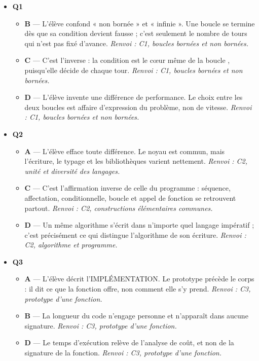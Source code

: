 \begin{itemize}
  \item \textbf{Q1}
  \begin{itemize}
    \item \textbf{B} — L'élève confond « non bornée » et « infinie ». Une boucle  se termine dès que sa condition devient fausse ; c'est seulement le nombre de tours qui n'est pas fixé d'avance. \emph{Renvoi : C1, boucles bornées et non bornées.}
    \item \textbf{C} — C'est l'inverse : la condition est le cœur même de la boucle , puisqu'elle décide de chaque tour. \emph{Renvoi : C1, boucles bornées et non bornées.}
    \item \textbf{D} — L'élève invente une différence de performance. Le choix entre les deux boucles est affaire d'expression du problème, non de vitesse. \emph{Renvoi : C1, boucles bornées et non bornées.}
  \end{itemize}
  \item \textbf{Q2}
  \begin{itemize}
    \item \textbf{A} — L'élève efface toute différence. Le noyau est commun, mais l'écriture, le typage et les bibliothèques varient nettement. \emph{Renvoi : C2, unité et diversité des langages.}
    \item \textbf{C} — C'est l'affirmation inverse de celle du programme : séquence, affectation, conditionnelle, boucle et appel de fonction se retrouvent partout. \emph{Renvoi : C2, constructions élémentaires communes.}
    \item \textbf{D} — Un même algorithme s'écrit dans n'importe quel langage impératif ; c'est précisément ce qui distingue l'algorithme de son écriture. \emph{Renvoi : C2, algorithme et programme.}
  \end{itemize}
  \item \textbf{Q3}
  \begin{itemize}
    \item \textbf{A} — L'élève décrit l'IMPLÉMENTATION. Le prototype précède le corps : il dit ce que la fonction offre, non comment elle s'y prend. \emph{Renvoi : C3, prototype d'une fonction.}
    \item \textbf{B} — La longueur du code n'engage personne et n'apparaît dans aucune signature. \emph{Renvoi : C3, prototype d'une fonction.}
    \item \textbf{D} — Le temps d'exécution relève de l'analyse de coût, et non de la signature de la fonction. \emph{Renvoi : C3, prototype d'une fonction.}

\end{itemize}
\end{itemize}
